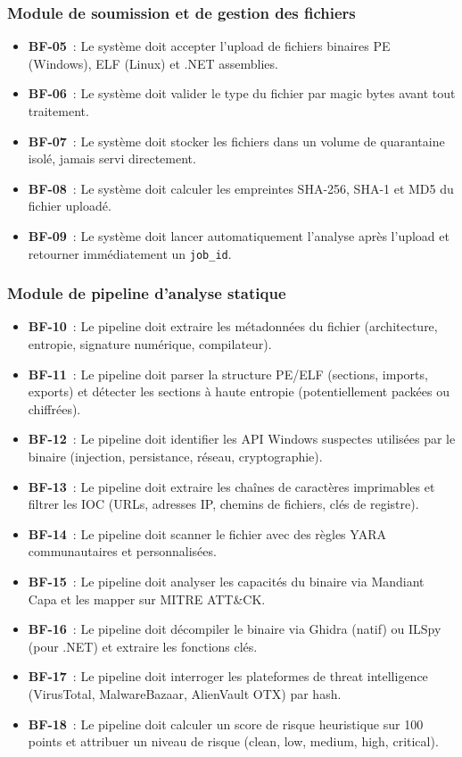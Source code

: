 \subsubsection{Module de soumission et de gestion des fichiers}
\begin{itemize}
  \item \textbf{BF-05}~: Le système doit accepter l'upload de fichiers binaires PE (Windows), ELF (Linux) et .NET assemblies.
  \item \textbf{BF-06}~: Le système doit valider le type du fichier par magic bytes avant tout traitement.
  \item \textbf{BF-07}~: Le système doit stocker les fichiers dans un volume de quarantaine isolé, jamais servi directement.
  \item \textbf{BF-08}~: Le système doit calculer les empreintes SHA-256, SHA-1 et MD5 du fichier uploadé.
  \item \textbf{BF-09}~: Le système doit lancer automatiquement l'analyse après l'upload et retourner immédiatement un \texttt{job\_id}.
\end{itemize}

\subsubsection{Module de pipeline d'analyse statique}
\begin{itemize}
  \item \textbf{BF-10}~: Le pipeline doit extraire les métadonnées du fichier (architecture, entropie, signature numérique, compilateur).
  \item \textbf{BF-11}~: Le pipeline doit parser la structure PE/ELF (sections, imports, exports) et détecter les sections à haute entropie (potentiellement packées ou chiffrées).
  \item \textbf{BF-12}~: Le pipeline doit identifier les API Windows suspectes utilisées par le binaire (injection, persistance, réseau, cryptographie).
  \item \textbf{BF-13}~: Le pipeline doit extraire les chaînes de caractères imprimables et filtrer les IOC (URLs, adresses IP, chemins de fichiers, clés de registre).
  \item \textbf{BF-14}~: Le pipeline doit scanner le fichier avec des règles YARA communautaires et personnalisées.
  \item \textbf{BF-15}~: Le pipeline doit analyser les capacités du binaire via Mandiant Capa et les mapper sur MITRE ATT\&CK.
  \item \textbf{BF-16}~: Le pipeline doit décompiler le binaire via Ghidra (natif) ou ILSpy (pour .NET) et extraire les fonctions clés.
  \item \textbf{BF-17}~: Le pipeline doit interroger les plateformes de threat intelligence (VirusTotal, MalwareBazaar, AlienVault OTX) par hash.
  \item \textbf{BF-18}~: Le pipeline doit calculer un score de risque heuristique sur 100 points et attribuer un niveau de risque (clean, low, medium, high, critical).
\end{itemize}

